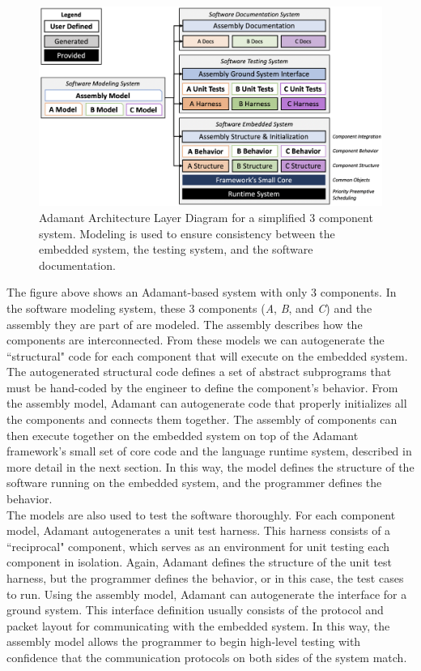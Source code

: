 \begin{figure}[H]
  \includegraphics[width=1.0\textwidth,center]{images/architecturelayers.png}
  \caption{Adamant Architecture Layer Diagram for a simplified 3 component system. Modeling is used to ensure consistency between the embedded system, the testing system, and the software documentation.}
\end{figure}

The figure above shows an Adamant-based system with only 3 components. In the software modeling system, these 3 components (\textit{A}, \textit{B}, and \textit{C}) and the assembly they are part of are modeled. The assembly describes how the components are interconnected. From these models we can autogenerate the ``structural" code for each component that will execute on the embedded system. The autogenerated structural code defines a set of abstract subprograms that must be hand-coded by the engineer to define the component's behavior. From the assembly model, Adamant can autogenerate code that properly initializes all the components and connects them together. The assembly of components can then execute together on the embedded system on top of the Adamant framework's small set of core code and the language runtime system, described in more detail in the next section. In this way, the model defines the structure of the software running on the embedded system, and the programmer defines the behavior. \\

The models are also used to test the software thoroughly. For each component model, Adamant autogenerates a unit test harness. This harness consists of a ``reciprocal" component, which serves as an environment for unit testing each component in isolation. Again, Adamant defines the structure of the unit test harness, but the programmer defines the behavior, or in this case, the test cases to run. Using the assembly model, Adamant can autogenerate the interface for a ground system. This interface definition usually consists of the protocol and packet layout for communicating with the embedded system. In this way, the assembly model allows the programmer to begin high-level testing with confidence that the communication protocols on both sides of the system match. \\

